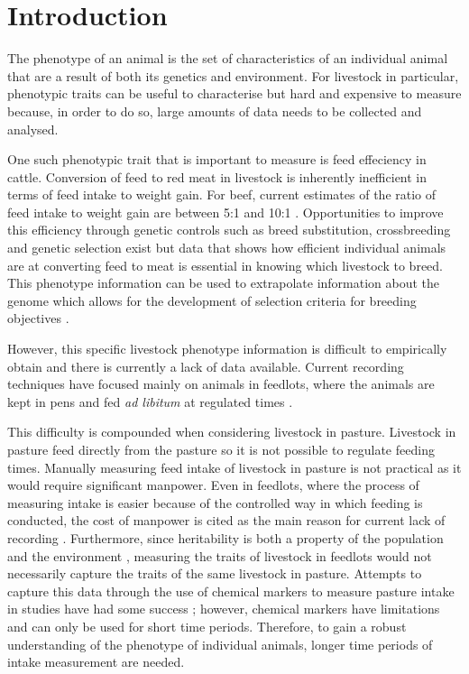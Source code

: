 \chapter{Introduction}

The phenotype of an animal is the set of characteristics of an individual animal that are a result of both its genetics and environment. For livestock in particular, phenotypic traits can be useful to characterise but hard and expensive to measure because, in order to do so, large amounts of data needs to be collected and analysed. 

One such phenotypic trait that is important to measure is feed effeciency in cattle. Conversion of feed to red meat in livestock is inherently inefficient in terms of feed intake to weight gain. For beef, current estimates of the ratio of feed intake to weight gain are between 5:1 and 10:1 \cite{Garnett2009}. Opportunities to improve this efficiency through genetic controls such as breed substitution, crossbreeding and genetic selection exist \cite{Hill2012} but data that shows how efficient individual animals are at converting feed to meat is essential in knowing which livestock to breed. This phenotype information can be used to extrapolate information about the genome which allows for the development of selection criteria for breeding objectives \cite{Pollak2012}.  

However, this specific livestock phenotype information is difficult to empirically obtain and there is currently a lack of data available. Current recording techniques have focused mainly on animals in feedlots, where the animals are kept in pens and fed \textit{ad libitum} at regulated times \cite{Arthur2005}.

This difficulty is compounded when considering livestock in pasture. Livestock in pasture feed directly from the pasture so it is not possible to regulate feeding times. Manually measuring feed intake of livestock in pasture is not practical as it would require significant manpower. Even in feedlots, where the process of measuring intake is easier because of the controlled way in which feeding is conducted, the cost of manpower is cited as the main reason for current lack of recording \cite{Barwick2010}. Furthermore, since heritability is both a property of the population and the environment \cite{Falconer1996}, measuring the traits of livestock in feedlots would not necessarily capture the traits of the same livestock in pasture. Attempts to capture this data through the use of chemical  markers to measure pasture intake in studies have had some success \cite{Barlow2009} \cite{Dove2006}; however, chemical markers have limitations and can only be used for short time periods. Therefore, to gain a robust understanding of the phenotype of individual animals, longer time periods of intake measurement are needed.

